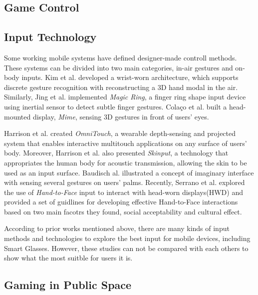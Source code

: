 \documentclass{sigchi}
\begin{document}
    \subsection{Game Control}

    \subsection{Input Technology}
    Some working mobile systems have defined designer-made controll methods. These systems can be divided into two main categories, in-air gestures and on-body inputs. Kim et al. \cite{Kim:2012:DFI:2380116.2380139} developed a wrist-worn architecture, which supports discrete gesture recognition with reconstructing a 3D hand modal in the air. Similarly, Jing et al. \cite{Jing:2013:MRS:2541831.2541875} implemented \textsl{Magic Ring}, a finger ring shape input device using inertial sensor to detect subtle finger gestures. Cola\c{c}o et al. \cite{Colaco:2013:MCL:2501988.2502042} built a head-mounted display, \textsl{Mime}, sensing 3D gestures in front of users' eyes. 

    Harrison et al. \cite{Harrison:2011:OWM:2047196.2047255} created \textsl{OmniTouch}, a wearable depth-sensing and projected system that enables interactive multitouch applications on any surface of users' body. Moreover, Harrison et al. \cite{Harrison:2010:SAB:1753326.1753394} also presented \textsl{Skinput}, a technology that appropriates the human body for acoustic transmission, allowing the skin to be used as an input surface. Baudisch al. \cite{Gustafson:2011:IPL:2047196.2047233} illustrated a concept of imaginary interface with sensing several gestures on users' palms. Recently, Serrano et al. \cite{Serrano:2014:EUH:2611247.2556984} explored the use of \textsl{Hand-to-Face} input to interact with head-worn displays(HWD) and provided a set of guidlines for developing effective Hand-to-Face interactions based on two main facotrs they found, social acceptability and cultural effect.

    According to prior works mentioned above, there are many kinds of input methods and technologies to explore the best input for mobile devices, including Smart Glasses. However, these studies can not be compared with each others to show what the most suitble for users it is.  
    \subsection{Gaming in Public Space}
\end{document}

